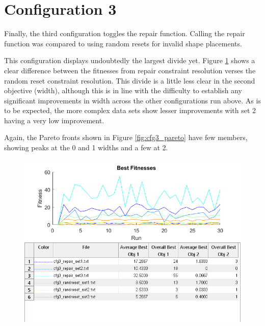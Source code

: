 \documentclass[11pt]{article}
\begin{document}
\section{Configuration 3}\label{sect:cfg3}

Finally, the third configuration toggles the repair function. Calling the repair function was compared to using random resets for invalid shape placements.

This configuration displays undoubtedly the largest divide yet. Figure \ref{fig:cfg3_best} shows a clear difference between the fitnesses from repair constraint resolution verses the random reset constraint resolution. This divide is a little less clear in the second objective (width), although this is in line with the difficulty to establish any significant improvements in width across the other configurations run above. As is to be expected, the more complex data sets show lesser improvements with set 2 having a very low improvement.

Again, the Pareto fronts shown in Figure \ref{fig:cfg3_pareto} have few members, showing peaks at the 0 and 1 widths and a few at 2.

\begin{figure}[H]
	\centering
  \includegraphics[width=5in]{assn1d_cfg3_bestfitness.png}
  \label{fig:cfg3_best}
\end{figure}
\end{document}
